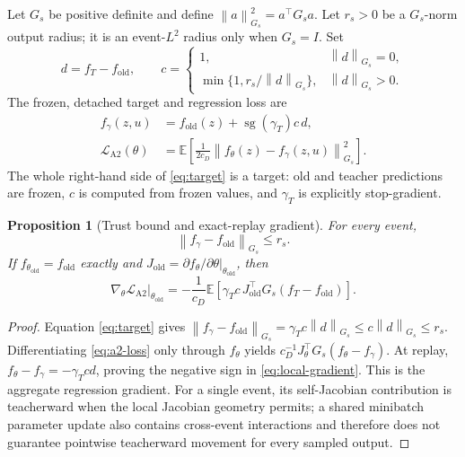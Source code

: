 \documentclass[11pt,a4paper]{article}
\newcommand{\E}{\mathbb{E}}
\newcommand{\norm}[1]{\left\lVert #1\right\rVert}
\newcommand{\sg}{\operatorname{sg}}
\newcommand{\old}{\mathrm{old}}
\theoremstyle{plain}
\newtheorem{proposition}[theorem]{Proposition}
\theoremstyle{definition}
\begin{document}
Let $G_s$ be positive definite and define
$\norm{a}_{G_s}^2=a^\top G_sa$.  Let $r_s>0$ be a $G_s$-norm output radius; it is an
event-$L^2$ radius only when $G_s=I$.  Set
\begin{equation}
d=f_T-f_{\old},
\qquad
c=
\begin{cases}
1,&\norm d_{G_s}=0,\\
\min\{1,r_s/\norm d_{G_s}\},&\norm d_{G_s}>0.
\end{cases}
\label{eq:projection}
\end{equation}
The frozen, detached target and regression loss are
\begin{align}
f_\gamma(z,u)
&=f_{\old}(z)+\sg(\gamma_T)c\,d,
\label{eq:target}\\
\mathcal L_{\mathrm{A2}}(\theta)
&=\E\!\left[\frac{1}{2c_D}
\norm{f_\theta(z)-f_\gamma(z,u)}_{G_s}^2\right].
\label{eq:a2-loss}
\end{align}
The whole right-hand side of \eqref{eq:target} is a target: old and teacher predictions are frozen,
$c$ is computed from frozen values, and $\gamma_T$ is explicitly stop-gradient.

\begin{proposition}[Trust bound and exact-replay gradient]
\label{prop:gradient}
For every event,
\begin{equation}
\norm{f_\gamma-f_{\old}}_{G_s}\le r_s.
\label{eq:trust-bound}
\end{equation}
If $f_{\theta_{\old}}=f_{\old}$ exactly and
$J_{\old}=\left.\partial f_\theta/\partial\theta\right|_{\theta_{\old}}$, then
\begin{equation}
\left.\nabla_\theta\mathcal L_{\mathrm{A2}}\right|_{\theta_{\old}}
=-\frac{1}{c_D}\E\!\left[
\gamma_Tc\,J_{\old}^{\top}G_s(f_T-f_{\old})
\right].
\label{eq:local-gradient}
\end{equation}
\end{proposition}

\begin{proof}
Equation \eqref{eq:target} gives
$\norm{f_\gamma-f_{\old}}_{G_s}=\gamma_Tc\norm d_{G_s}
\le c\norm d_{G_s}\le r_s$.
Differentiating \eqref{eq:a2-loss} only through $f_\theta$ yields
$c_D^{-1}J_\theta^\top G_s(f_\theta-f_\gamma)$.  At replay,
$f_\theta-f_\gamma=-\gamma_Tcd$, proving the negative sign in
\eqref{eq:local-gradient}.  This is the aggregate regression gradient.  For a single event, its
self-Jacobian contribution is teacherward when the local Jacobian geometry permits; a shared
minibatch parameter update also contains cross-event interactions and therefore does not
guarantee pointwise teacherward movement for every sampled output.
\end{proof}
\end{document}
